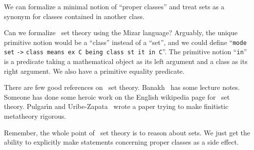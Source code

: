 \begin{node}\label{nbg-0000}
We can formalize a minimal notion of ``proper classes'' and treat
sets as a synonym for classes contained in another class.
\end{node}

\begin{puzzle}\label{nbg-0001}
Can we formalize \NBG\ set theory using the Mizar language? Arguably, the
unique primitive notion would be a ``class'' instead of a ``set'', and
we could define ``\texttt{mode set} \verb|->| \texttt{class means ex C
  being class st it in C}''. The primitive notion ``\texttt{in}'' is a
predicate taking a mathematical object as its left argument and a class
as its right argument. We also have a primitive equality predicate.

\begin{node}[References]\label{nbg-0002}
There are few good references on \NBG\ set
theory. Banakh~\cite{banakh2023classical} has some lecture
notes. Someone has done some heroic work on the English wikipedia page
for \NBG\ set theory.  Pulgar\'{\i}n and
Uribe-Zapata~\cite{pulgarin2023came} wrote a paper trying to make
finitistic metatheory rigorous.
\end{node}

\begin{node}\label{nbg-0003}
Remember, the whole point of \NBG\ set theory is to reason about sets. We
just get the ability to explicitly make statements concerning proper
classes as a side effect.
\end{node}
\end{puzzle}

